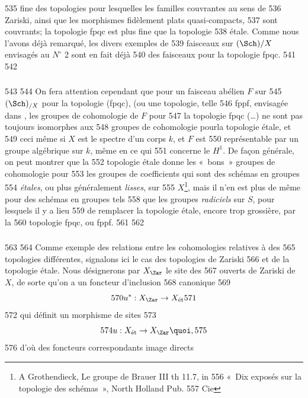    535	fine des topologies pour lesquelles les familles couvrantes au sens de
   536	Zariski, ainsi que les morphismes fidèlement plats quasi-compacts,
   537	sont couvrants; la topologie fpqc est plus fine que la topologie
   538	étale. Comme nous l'avons déjà remarqué, les divers exemples de
   539	faisceaux sur $(\Sch)/X$ envisagés au $N^{\circ}$ 2 sont en fait déjà
   540	des faisceaux pour la topologie fpqc.
   541	
   542	\subsubsection{}
   543	
   544	On fera attention cependant que pour un faisceau abélien $F$ sur
   545	$(\Sch)_{/X}$ pour la topologie (fpqc), (ou une topologie, telle
   546	fppf, envisagée dans , les  groupes de cohomologie de $F$ pour
   547	la topologie fpqc (\resp\ldots) ne sont pas toujours isomorphes aux
   548	groupes de cohomologie pour\pageoriginale la topologie étale, et
   549	ceci même si $X$ est le spectre d'un corps $k$, et $F$ est
   550	représentable par un groupe algébrique sur $k$, même en ce qui
   551	concerne le $H^{1}$. De façon générale, on peut montrer que la
   552	topologie étale donne les « bons » groupes de cohomologie pour
   553	les groupes de coefficients qui sont des schémas en groupes
   554	\emph{étales}, ou plus généralement \emph{lisses}, sur
   555	$X$\footnote{\Cf A Grothendieck, Le groupe de Brauer III th 11.7, in
   556	« Dix exposés sur la topologie des schémas », North Holland Pub.
   557	Cie}, mais il n'en est plus de même pour des schémas en groupes tels
   558	que les groupes \emph{radiciels} sur $S$, pour lesquels il y a lieu
   559	de remplacer la topologie étale, encore trop grossière, par la
   560	topologie fpqc, ou fppf.
   561	
   562	\subsubsection{}
   563	
   564	Comme exemple des relations entre les cohomologies relatives à des
   565	topologies différentes, signalons ici le cas des topologies de Zariski
   566	et de la topologie étale. Nous désignerons par $X_{\Zar}$ le site des
   567	ouverts de Zariski de $X$, de sorte qu'on a un foncteur d'inclusion
   568	canonique
   569	$$
   570	u^{\ast} : X_{\Zar} \to X_{\text{ét}}
   571	$$
   572	qui définit un morphisme de sites
   573	$$
   574	u : X_{\text{ét}} \to X_{\Zar}{\quoi},
   575	$$
   576	d'où des foncteurs correspondants image directs
